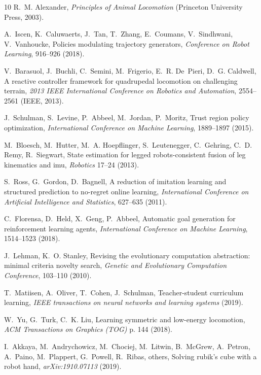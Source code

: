 \documentclass[9pt,twocolumn,twoside]{osajnl}
\begin{document}
\begin{thebibliography}{10}
R.~M. Alexander, {\it Principles of Animal Locomotion\/} (Princeton University
  Press, 2003).

A.~Iscen, K.~Caluwaerts, J.~Tan, T.~Zhang, E.~Coumans, V.~Sindhwani,
  V.~Vanhoucke, Policies modulating trajectory generators, {\it Conference on
  Robot Learning\/},  916--926 (2018).

V.~Barasuol, J.~Buchli, C.~Semini, M.~Frigerio, E.~R. De~Pieri, D.~G. Caldwell,
  A reactive controller framework for quadrupedal locomotion on challenging
  terrain, {\it 2013 IEEE International Conference on Robotics and
  Automation\/},  2554--2561 (IEEE, 2013).

J.~Schulman, S.~Levine, P.~Abbeel, M.~Jordan, P.~Moritz, Trust region policy
  optimization, {\it International Conference on Machine Learning\/},
  1889--1897 (2015).

M.~Bloesch, M.~Hutter, M.~A. Hoepflinger, S.~Leutenegger, C.~Gehring, C.~D.
  Remy, R.~Siegwart, State estimation for legged robots-consistent fusion of
  leg kinematics and imu, {\it Robotics\/}  17--24 (2013).

S.~Ross, G.~Gordon, D.~Bagnell, A reduction of imitation learning and
  structured prediction to no-regret online learning, {\it International
  Conference on Artificial Intelligence and Statistics\/},  627--635 (2011).

C.~Florensa, D.~Held, X.~Geng, P.~Abbeel, Automatic goal generation for
  reinforcement learning agents, {\it International Conference on Machine
  Learning\/},  1514--1523 (2018).

J.~Lehman, K.~O. Stanley, Revising the evolutionary computation abstraction:
  minimal criteria novelty search, {\it Genetic and Evolutionary Computation
  Conference\/},  103--110 (2010).

T.~Matiisen, A.~Oliver, T.~Cohen, J.~Schulman, Teacher-student curriculum
  learning, {\it IEEE transactions on neural networks and learning systems\/}
  (2019).

W.~Yu, G.~Turk, C.~K. Liu, Learning symmetric and low-energy locomotion, {\it
  ACM Transactions on Graphics (TOG)\/} p. 144 (2018).

I.~Akkaya, M.~Andrychowicz, M.~Chociej, M.~Litwin, B.~McGrew, A.~Petron,
  A.~Paino, M.~Plappert, G.~Powell, R.~Ribas, others, Solving rubik's cube with
  a robot hand, {\it arXiv:1910.07113\/}  (2019).


\end{thebibliography}
\end{document}
